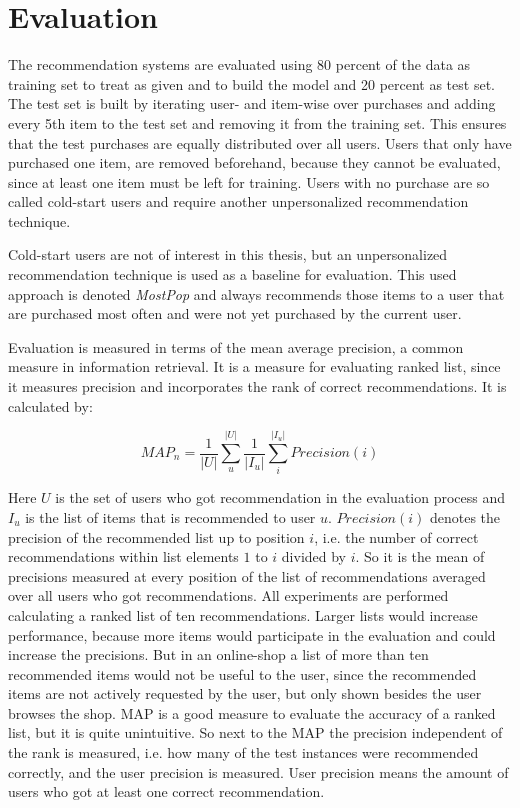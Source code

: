 \documentclass[10pt]{reportMaster}
\begin{document}


 \section{Evaluation}
\label{sec:eval}
The recommendation systems are evaluated using 80 percent of the data as training set to treat as given and to build the model and 20 percent as test set.
The test set is built by iterating user- and item-wise over purchases and adding every 5th item to the test set and removing it from the training set.
This ensures that the test purchases are equally distributed over all users.
Users that only have purchased one item, are removed beforehand, because they cannot be evaluated, since at least one item must be left for training.
Users with no purchase are so called cold-start users and require another unpersonalized recommendation technique.

Cold-start users are not of interest in this thesis, but an unpersonalized recommendation technique is used as a baseline for evaluation.
This used approach is denoted \textit{MostPop} and always recommends those items to a user that are purchased most often and were not yet purchased by the current user.

Evaluation is measured in terms of the mean average precision, a common measure in information retrieval.
It is a measure for evaluating ranked list, since it measures precision and incorporates the rank of correct recommendations.
It is calculated by:

\begin{equation}
	MAP_n = \frac{1}{|U|} \sum_u^{|U|} \frac{1}{|I_u|}\sum_i^{|I_u|} Precision(i)
\end{equation}

Here $U$ is the set of users who got recommendation in the evaluation process and $I_u$ is the list of items that is recommended to user $u$.
$Precision(i)$ denotes the precision of the recommended list up to position $i$, i.e. the number of correct recommendations within list elements $1$ to $i$ divided by $i$.
So it is the mean of precisions measured at every position of the list of recommendations averaged over all users who got recommendations.
All experiments are performed calculating a ranked list of ten recommendations.
Larger lists would increase performance, because more items would participate in the evaluation and could increase the precisions. %
But in an online-shop a list of more than ten recommended items would not be useful to the user, since the recommended items are not actively requested by the user, but only shown besides the user browses the shop.
MAP is a good measure to evaluate the accuracy of a ranked list, but it is quite unintuitive.
So next to the MAP the precision independent of the rank is measured, i.e. how many of the test instances were recommended correctly, and the user precision is measured.
User precision means the amount of users who got at least one correct recommendation.
\end{document}
